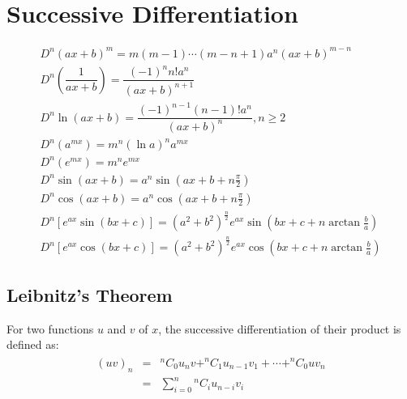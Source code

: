 \chapter{Successive Differentiation}
\begin{align}
	D^n (ax+b)^m=m(m-1)\cdots(m-n+1) a^n (ax+b)^{m-n}\\
	D^n \left(\dfrac{1}{ax+b}\right)=\dfrac{(-1)^n n!a^n}{(ax+b)^{n+1}}\\
	D^n \ln(ax+b)=\dfrac{(-1)^{n-1} (n-1)!a^n}{(ax+b)^n}, n \geq 2\\
	D^n (a^{mx})=m^n (\ln a)^n a^{mx}\\
	D^n (e^{mx})=m^n e^{mx}\\
	D^n \sin (ax+b)=a^n \sin(ax+b+n\frac{\pi}{2})\\
	D^n \cos (ax+b)=a^n \cos(ax+b+n\frac{\pi}{2})\\
	D^n [e^{ax} \sin(bx+c)]=(a^2+b^2)^{\frac{n}{2}} e^{ax} \sin(bx+c+n\arctan\frac{b}{a})\\
	D^n [e^{ax} \cos(bx+c)]=(a^2+b^2)^{\frac{n}{2}} e^{ax} \cos(bx+c+n\arctan\frac{b}{a})
\end{align}


\section{Leibnitz's Theorem}
For two functions $u$ and $v$ of $x$, the successive differentiation of their product is defined as:
\begin{equation}
	\begin{aligned}
		\begin{split}
			(uv)_n & = &^nC_0 u_n v+^nC_1 u_{n-1} v_1+\cdots+^nC_0 u v_n\\
			& = & \sum_{i=0}^n {^nC_i} u_{n-i} v_i
		\end{split}
	\end{aligned}
\end{equation}
